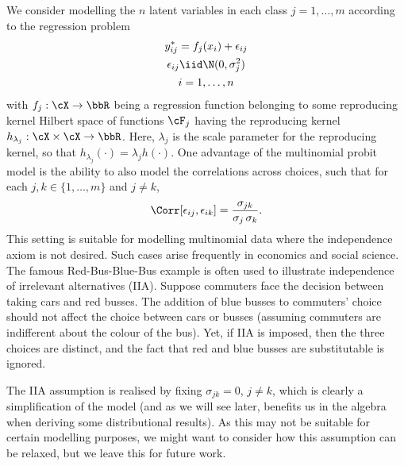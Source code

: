 We consider modelling the $n$ latent variables in each class $j=1,\dots,m$ according to the regression problem
\begin{equation}\label{eq:multinomial-latent}
  \begin{gathered}
    y_{ij}^* = f_j(x_i) + \epsilon_{ij} \\
    \epsilon_{ij} \iid \N(0, \sigma_j^2) \\
    i = 1,\dots,n
  \end{gathered}
\end{equation}
with $f_j:\cX \to \bbR$ being a regression function belonging to some reproducing kernel Hilbert space of functions $\cF_j$ having the reproducing kernel $h_{\lambda_j}: \cX \times \cX \to \bbR$. Here, $\lambda_j$ is the scale parameter for the reproducing kernel, so that $h_{\lambda_j}(\cdot) = \lambda_j h(\cdot)$. One advantage of the multinomial probit model is the ability to also model the correlations across choices, such that for each $j,k \in \{1,\dots,m\}$ and $j \neq k$,
\[
  \Corr[\epsilon_{ij}, \epsilon_{ik}] = \frac{\sigma_{jk}}{\sigma_j \, \sigma_k}.
\]
This setting is suitable for modelling multinomial data where the independence axiom is not desired. Such cases arise frequently in economics and social science. The famous Red-Bus-Blue-Bus example is often used to illustrate independence of irrelevant alternatives (IIA). Suppose commuters face the decision between taking cars and red busses. The addition of blue busses to commuters' choice should not affect the choice between cars or busses (assuming commuters are indifferent about the colour of the bus). Yet, if IIA is imposed, then the three choices are distinct, and the fact that red and blue busses are substitutable is ignored.

The IIA assumption is realised by fixing $\sigma_{jk} = 0$, $j \neq k$, which is clearly a simplification of the model (and as we will see later, benefits us in the algebra when deriving some distributional results). As this may not be suitable for certain modelling purposes, we might want to consider how this assumption can be relaxed, but we leave this for future work. 

